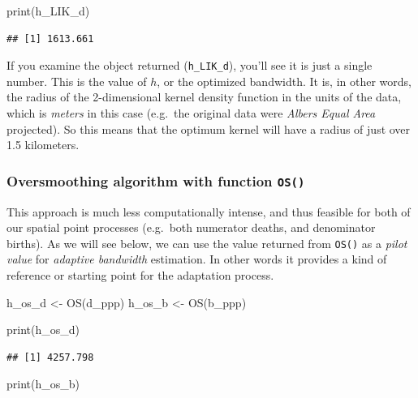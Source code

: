 \documentclass[
]{book}
\newenvironment{Shaded}{\begin{snugshade}}{\end{snugshade}}
\newcommand{\FunctionTok}[1]{\textcolor[rgb]{0.00,0.00,0.00}{#1}}
\newcommand{\NormalTok}[1]{#1}
\newcommand{\OtherTok}[1]{\textcolor[rgb]{0.56,0.35,0.01}{#1}}
\begin{document}
\begin{Shaded}
\begin{Highlighting}[]
\FunctionTok{print}\NormalTok{(h\_LIK\_d)}
\end{Highlighting}
\end{Shaded}

\begin{verbatim}
## [1] 1613.661
\end{verbatim}

If you examine the object returned (\texttt{h\_LIK\_d}), you'll see it is just a single number. This is the value of \(h\), or the optimized bandwidth. It is, in other words, the radius of the 2-dimensional kernel density function in the units of the data, which is \emph{meters} in this case (e.g.~the original data were \emph{Albers Equal Area} projected). So this means that the optimum kernel will have a radius of just over 1.5 kilometers.

\hypertarget{oversmoothing-algorithm-with-function-os}{%
\subsubsection{\texorpdfstring{Oversmoothing algorithm with function \texttt{OS()}}{Oversmoothing algorithm with function OS()}}\label{oversmoothing-algorithm-with-function-os}}

This approach is much less computationally intense, and thus feasible for both of our spatial point processes (e.g.~both numerator deaths, and denominator births). As we will see below, we can use the value returned from \texttt{OS()} as a \emph{pilot value} for \emph{adaptive bandwidth} estimation. In other words it provides a kind of reference or starting point for the adaptation process.

\begin{Shaded}
\begin{Highlighting}[]
\NormalTok{h\_os\_d }\OtherTok{\textless{}{-}} \FunctionTok{OS}\NormalTok{(d\_ppp)}
\NormalTok{h\_os\_b }\OtherTok{\textless{}{-}} \FunctionTok{OS}\NormalTok{(b\_ppp)}

\FunctionTok{print}\NormalTok{(h\_os\_d)}
\end{Highlighting}
\end{Shaded}

\begin{verbatim}
## [1] 4257.798
\end{verbatim}

\begin{Shaded}
\begin{Highlighting}[]
\FunctionTok{print}\NormalTok{(h\_os\_b)}
\end{Highlighting}
\end{Shaded}
\end{document}
